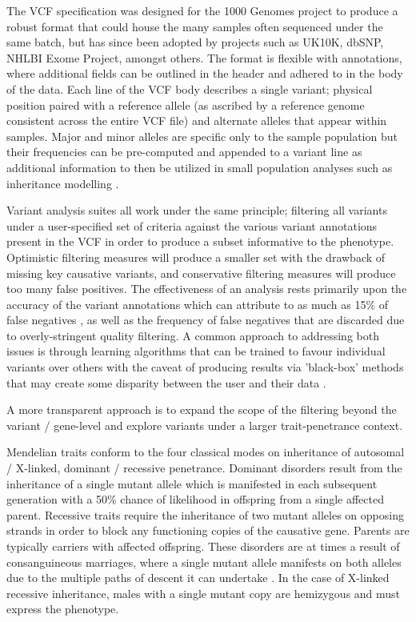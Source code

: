 \documentclass[twocolumn]{bmcart}%
\begin{document}
The VCF specification was designed for the 1000 Genomes project to produce a robust format that could house the many samples often sequenced under the same batch, but has since been adopted by projects such as UK10K, dbSNP, NHLBI Exome Project, amongst others. The format is flexible with annotations, where additional fields can be outlined in the header and adhered to in the body of the data. Each line of the VCF body describes a single variant; physical position paired with a reference allele (as ascribed by a reference genome consistent across the entire VCF file) and alternate alleles that appear within samples. Major and minor alleles are specific only to the sample population but their frequencies can be pre-computed and appended to a variant line as additional information to then be utilized in small population analyses such as inheritance modelling \cite{danecek2011variant}.

Variant analysis suites all work under the same principle; filtering all variants under a user-specified set of criteria against the various variant annotations present in the VCF in order to produce a subset informative to the phenotype. Optimistic filtering measures will produce a smaller set with the drawback of missing key causative variants, and conservative filtering measures will produce too many false positives. The effectiveness of an analysis rests primarily upon the accuracy of the variant annotations which can attribute to as much as 15\% of false negatives \cite{warden2014detailed}, as well as the frequency of false negatives that are discarded due to overly-stringent quality filtering. A common approach to addressing both issues is through learning algorithms that can be trained to favour individual variants over others with the caveat of producing results via 'black-box' methods that may create some disparity between the user and their data \cite{pabinger2014survey}. 

A more transparent approach is to expand the scope of the filtering beyond the variant / gene-level and explore variants under a larger trait-penetrance context.%

Mendelian traits conform to the four classical modes on inheritance of autosomal / X-linked, dominant / recessive penetrance. Dominant disorders result from the inheritance of a single mutant allele which is manifested in each subsequent generation with a 50\% chance of likelihood in offspring from a single affected parent. Recessive traits require the inheritance of two mutant alleles on opposing strands in order to block any functioning copies of the causative gene. Parents are typically carriers with affected offspring. These disorders are at times a result of consanguineous marriages, where a single mutant allele manifests on both alleles due to the multiple paths of descent it can undertake \cite{kari2014consanguinity}. In the case of X-linked recessive inheritance, males with a single mutant copy are hemizygous and must express the phenotype. %
\end{document}
